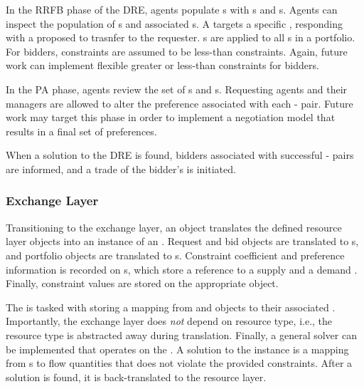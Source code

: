 In the RRFB phase of the DRE, agents populate s with
s and s. Agents can inspect the
population of s and associated s. A
 targets a specific , responding with a proposed
 to trasnfer to the requester. s
are applied to all s in a portfolio. For bidders, constraints are
assumed to be less-than constraints. Again, future work can implement flexible
greater or less-than constraints for bidders.

In the PA phase, agents review the set of s and
s. Requesting agents and their managers are allowed to alter the
preference associated with each - pair. Future
work may target this phase in order to implement a negotiation model that
results in a final set of preferences.

When a solution to the DRE is found, bidders associated with successful
- pairs are informed, and a trade of the bidder's
 is initiated.

\subsubsection{Exchange Layer} 

Transitioning to the exchange layer, an  object translates
the defined resource layer objects into an instance of an
. Request and bid objects are translated to
s, and portfolio objects are translated to
s. Constraint coefficient and preference information is
recorded on s, which store a reference to a supply
 and a demand . Finally, constraint values
are stored on the appropriate  object.

The  is tasked with storing a mapping from
 and  objects to their associated
. Importantly, the exchange layer does \textit{not} depend on
resource type, i.e., the resource type is abstracted away during
translation. Finally, a general solver can be implemented that operates on the
. A solution to the  instance is a
mapping from s to flow quantities that does not violate the
provided constraints. After a solution is found, it is back-translated to the
resource layer.

